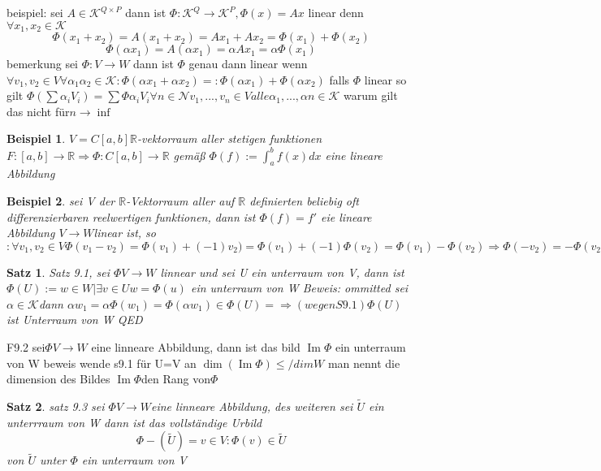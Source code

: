 \documentclass[11pt]{article}
\newtheorem{beispiel}{Beispiel}
\newtheorem{satz}{Satz}
\DeclareMathOperator{\IM}{Im}
\begin{document}
beispiel: sei $A \in \mathcal{K}^{Q\times P}$ dann ist $\Phi: \mathcal{K}^Q \rightarrow \mathcal{K}^P , \Phi (x)= A x$ linear denn $\forall x_1, x_2 \in \mathcal{K}$
\[
\Phi (x_1+x_2)= A(x_1+x_2)= A x_1+Ax_2= \Phi (x_1)+\Phi (x_2)
\]
\[
\Phi (\alpha x_1)=A(\alpha x_1)=\alpha Ax_1= \alpha \Phi (x_1)
\]bemerkung sei $ \Phi : V \rightarrow W $ dann ist $\Phi$ genau dann linear wenn $\forall v_1, v_2 \in V \forall \alpha_1 \alpha_2  \in \mathcal{K} : \Phi (\alpha x_1+\alpha x_2)=:\Phi (\alpha x_1)+\Phi (\alpha x_2)$
falls $\Phi$ linear so gilt $\Phi (\sum \alpha_iV_i )= \sum \Phi \alpha_iV_i \forall n \in \mathcal{N} v_1,...,v_n \in V alle \alpha_1,...,\alpha n \in \mathcal{K}$
warum gilt das nicht für$ n\rightarrow \inf$
\begin{beispiel}
 $V = C [a,b] \mathbb{R}$-vektorraum aller stetigen funktionen  $F:[a,b]  \rightarrow \mathbb{R} \Rightarrow \Phi : C [a,b]  \rightarrow \mathbb{R}$ gemäß $\Phi(f):= \int_{a}^{b}{f(x)dx}$ eine lineare Abbildung
\end{beispiel}
\begin{beispiel}
 sei V der $\mathbb{R}$-Vektorraum aller auf $\mathbb{R}$ definierten beliebig oft differenzierbaren reelwertigen funktionen,
 dann ist $\Phi (f)=f'$ eie lineare Abbildung $V \rightarrow W  $linear    ist, so 
 $:\forall v_1, v_2 \in V  \Phi (v_1-v_2)=\Phi (v_1)+(-1)v_2)= \Phi (v_1)+(-1)\Phi (v_2)=\Phi (v_1)-\Phi (v_2) \Rightarrow \Phi (-v_2)=-\Phi (v_2)$
\end{beispiel}

\begin{satz}
 Satz 9.1, sei $\Phi V \rightarrow W$ linnear und sei U ein unterraum von V, dann ist 
 $\Phi(U):= { w \in W | \exists v \in U w = \Phi (u)} $
 ein unterraum von W
Beweis: ommitted
sei $\alpha \in \mathcal{K}$dann $\alpha w_1  = \alpha\Phi(w_1)= \Phi(\alpha w_1) \in \Phi (U)= \Rightarrow (wegen S9.1) \Phi (U) $ ist Unterraum von W QED
\end{satz}


F9.2 sei$ \Phi V \rightarrow W$ eine  linneare Abbildung, dann ist das bild $\IM \Phi$ ein unterraum von W
beweis wende s9.1 für U=V an 
$\dim (\IM \Phi) \leq /dim W$
man nennt die dimension des Bildes $\IM \Phi $den Rang von$ \Phi $

\begin{satz}
 satz 9.3
sei $\Phi V \rightarrow W $eine  linneare Abbildung, des weiteren sei $\tilde{U}$ ein unterrraum von W dann ist das vollständige Urbild \[\Phi-(\tilde{U} ) = {v \in V: \Phi (v) \in \tilde{U} }\]
von $\tilde{U} $ unter $\Phi$ ein unterraum von V
\end{satz}
\end{document}
